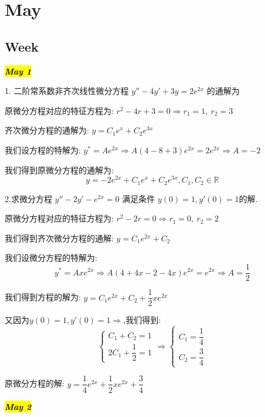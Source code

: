 \chapter{May}
\section{Week }
\hl{\textbf{\textit{May 1}}}

1. 二阶常系数非齐次线性微分方程 $y''-4y'+3y=2e^{2x}$ 的通解为
\begin{solution}
	
	原微分方程对应的特征方程为: $r^2-4r+3=0\Rightarrow r_{1}=1,\ r_{2}=3$
	
	齐次微分方程的通解为: $y=C_{1}e^{x}+C_{2}e^{3x}$
	
	我们设方程的特解为: $y^{*}=Ae^{2x}\Rightarrow A(4-8+3)e^{2x}=2e^{2x}\Rightarrow A=-2$
	
	我们得到原微分方程的通解为: 
	$$y=-2e^{2x}+C_{1}e^{x}+C_{2}e^{3x},C_{1},C_{2}\in\mathbb{R}$$
\end{solution}

2.求微分方程 $y''-2y'-e^{2x}=0$ 满足条件 $y(0)=1,y'(0)=1$的解.
\begin{solution}
	
	原微分方程对应的特征方程为: $r^2-2r=0\Rightarrow r_{1}=0,\ r_{2}=2$
	
	我们得到齐次微分方程的通解: $y=C_{1}e^{2x}+C_{2}$
	
	我们设微分方程的特解为: $$y^{*}=Axe^{2x}\Rightarrow A(4+4x-2-4x)e^{2x}=e^{2x}\Rightarrow A=\frac{1}{2}$$
	
	我们得到方程的解为: $y=C_{1}e^{2x}+C_{2}+\dfrac{1}{2}xe^{2x}$
	
	又因为$y(0)=1,y'(0)=1\Rightarrow$,我们得到: 
	$$\left\lbrace 
	\begin{array}{l}
		C_{1}+C_{2}=1\\
		2C_{1}+\dfrac{1}{2}=1
	\end{array}
	\right. \Rightarrow \left\lbrace 
	\begin{array}{l}
		C_{1}=\dfrac{1}{4}\\
		C_{2}=\dfrac{3}{4}
	\end{array}
	\right. $$
	
	原微分方程的解: $y=\dfrac{1}{4}e^{2x}+\dfrac{1}{2}xe^{2x}+\dfrac{3}{4}$
\end{solution}

\hl{\textbf{\textit{May 2}}}

